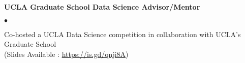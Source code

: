 \documentclass[margin,line]{res}
\newenvironment{list2}{
  \begin{list}{$\bullet$}{%
      \setlength{\itemsep}{0in}
      \setlength{\parsep}{0in} \setlength{\parskip}{0in}
      \setlength{\topsep}{0in} \setlength{\partopsep}{0in} 
      \setlength{\leftmargin}{0.2in}}}{\end{list}}
\begin{document}
\begin{resume}
{\bf UCLA Graduate School Data Science Advisor/Mentor}
\begin{list2}
  \item Co-hosted a UCLA Data Science competition in collaboration with UCLA's Graduate School \\ (Slides Available : \url{https://is.gd/qnji8A})
\end{list2}






%

\end{resume}
\end{document}
